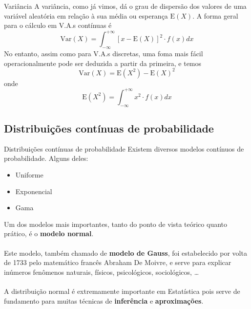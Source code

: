 \documentclass[10pt]{beamer}\usepackage[]{graphicx}\usepackage[]{color}
\providecommand{\E}{\text{E}}
\providecommand{\Var}{\text{Var}}
\theoremstyle{definition}
\begin{document}
\begin{frame}[fragile]{Variância}
  A variância, como já vimos, dá o grau de dispersão
  dos valores de uma variável aleatória em relação à sua média ou
  esperança $\E(X)$.  A forma geral para o cálculo em V.A.s contínuas é
  \begin{equation*}
    \Var(X) = \int_{-\infty}^{+\infty} [x - \E(X)]^2 \cdot f(x) dx
  \end{equation*}
  No entanto, assim como para V.A.s discretas, uma foma mais fácil
  operacionalmente pode ser deduzida a partir da primeira, e temos
  \begin{equation*}
    \Var(X) = \E(X^2) - \E(X)^2
  \end{equation*}
  onde
  \begin{equation*}
    \E(X^2) = \int_{-\infty}^{+\infty} x^2 \cdot f(x) dx
  \end{equation*}
\end{frame}


\subsection[Distribuições Contínuas]{Distribuições contínuas de
  probabilidade}

\begin{frame}[fragile]{Distribuições contínuas de probabilidade}
  Existem diversos modelos contínuos de probabilidade. Alguns deles:
  \begin{itemize}
  \item Uniforme
  \item Exponencial
  \item Gama
  \end{itemize}
  \vspace{1em}
  Um dos modelos mais importantes, tanto do ponto de vista teórico
  quanto prático, é o \textbf{modelo normal}. \\~\\
  Este modelo, também chamado de \textbf{modelo de Gauss}, foi
  estabelecido por volta de 1733 pelo matemático francês Abraham De
  Moivre, e serve para explicar inúmeros fenômenos naturais, físicos,
  psicológicos, sociológicos, \ldots \\~\\
  A distribuição normal é extremamente importante em Estatística pois
  serve de fundamento para muitas técnicas de \textbf{inferência} e
  \textbf{aproximações}.
\end{frame}
\end{document}
